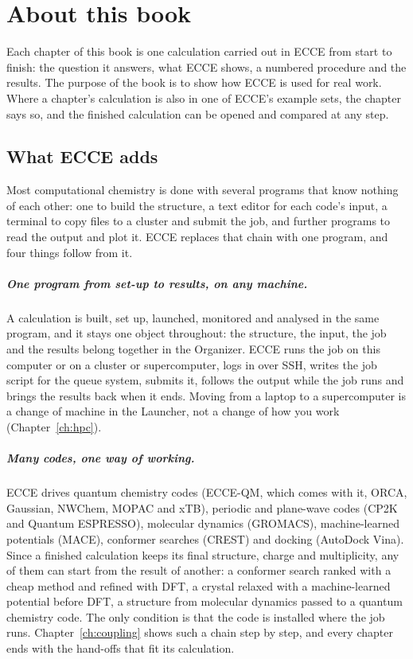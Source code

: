 \chapter*{About this book}
Each chapter of this book is one calculation carried out in ECCE from start to finish: the question it answers, what ECCE shows, a numbered procedure and the results. The purpose of the book is to show how ECCE is used for real work. Where a chapter's calculation is also in one of ECCE's example sets, the chapter says so, and the finished calculation can be opened and compared at any step.

\section*{What ECCE adds}
Most computational chemistry is done with several programs that know nothing of each other: one to build the structure, a text editor for each code's input, a terminal to copy files to a cluster and submit the job, and further programs to read the output and plot it. ECCE replaces that chain with one program, and four things follow from it.

\paragraph{One program from set-up to results, on any machine.} A calculation is built, set up, launched, monitored and analysed in the same program, and it stays one object throughout: the structure, the input, the job and the results belong together in the Organizer. ECCE runs the job on this computer or on a cluster or supercomputer, logs in over SSH, writes the job script for the queue system, submits it, follows the output while the job runs and brings the results back when it ends. Moving from a laptop to a supercomputer is a change of machine in the Launcher, not a change of how you work (Chapter~\ref{ch:hpc}).

\paragraph{Many codes, one way of working.} ECCE drives quantum chemistry codes (ECCE-QM, which comes with it, ORCA, Gaussian, NWChem, MOPAC and xTB), periodic and plane-wave codes (CP2K and Quantum ESPRESSO), molecular dynamics (GROMACS), machine-learned potentials (MACE), conformer searches (CREST) and docking (AutoDock Vina). Since a finished calculation keeps its final structure, charge and multiplicity, any of them can start from the result of another: a conformer search ranked with a cheap method and refined with DFT, a crystal relaxed with a machine-learned potential before DFT, a structure from molecular dynamics passed to a quantum chemistry code. The only condition is that the code is installed where the job runs. Chapter~\ref{ch:coupling} shows such a chain step by step, and every chapter ends with the hand-offs that fit its calculation.

